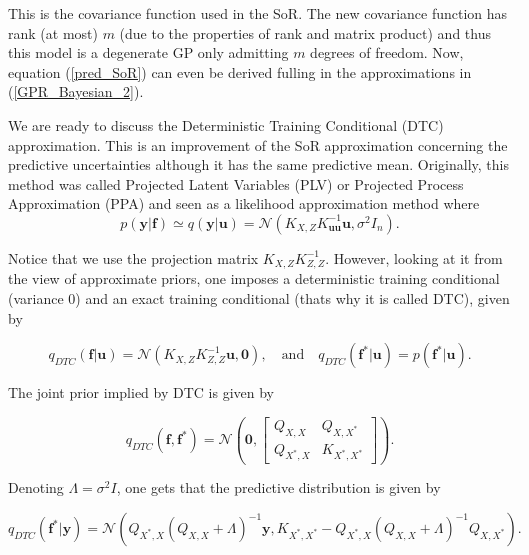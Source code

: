 \documentclass[12pt,a4paper,oneside]{book}
\begin{document}
This is the covariance function used in the SoR. The new covariance function has rank (at most) $m$ (due to the properties of rank and matrix product) and thus this model is a degenerate GP only admitting  $m$ degrees of freedom. Now, equation (\ref{pred_SoR}) can even be derived fulling in the approximations in (\ref{GPR_Bayesian_2}).   


We are ready to discuss the Deterministic Training Conditional (DTC)  approximation. This is an improvement of the SoR approximation  concerning the predictive uncertainties although it has the same predictive mean.  Originally, this method was called Projected Latent Variables (PLV) or Projected Process Approximation (PPA) and seen as a likelihood approximation method where 
\begin{equation}\label{llh_dtc}
p(\bm{y}|\bm{f}) \simeq q(\bm{y}|\bm{u}) = \mathcal{N}(K_{X,Z} K^{-1}_{\bm{u} \bm{u}} \bm{u}, \sigma^2 I_n).
\end{equation}

Notice that we use the projection matrix $K_{X,Z} K^{-1}_{Z,Z}$.  However, looking at it from the view of approximate priors, one imposes a deterministic training conditional (variance $0$) and an exact training conditional (thats why it is called DTC), given by

\begin{equation} \label{dtc}
q_{DTC}(\bm{f}|\bm{u}) = \mathcal{N}(K_{X,Z} K^{-1}_{Z,Z} \bm{u} , \bm{0}), \quad \text{and} \quad q_{DTC}(\bm{f}^{\ast} | \bm{u}) = p (\bm{f}^{\ast}| \bm{u}). 
\end{equation}

The joint prior implied by DTC is given by

\begin{equation}
q_{DTC}(\bm{f},\bm{f}^{\ast}) = 
\mathcal{N} \left( \bm{0}, 
\begin{bmatrix}
    Q_{X,X} & Q_{X,X^{\ast}}\\
    Q_{X^{\ast},X}  & K_{X^{\ast},X^{\ast}}
\end{bmatrix} 
\right).
\end{equation}

Denoting $\Lambda = \sigma^2 I$, one gets that the predictive distribution is given by

\begin{equation}\label{sparse2}
q_{DTC} (\bm{f}^{\ast} | \bm{y} ) = \mathcal{N}(Q_{X^{\ast},X}(Q_{X,X} + \Lambda)^{-1}\bm{y}, K_{X^{\ast} ,X^{\ast}} - Q_{X^{\ast},X}(Q_{X,X} + \Lambda)^{-1} Q_{X,X^{\ast}}).
\end{equation}
\end{document}
